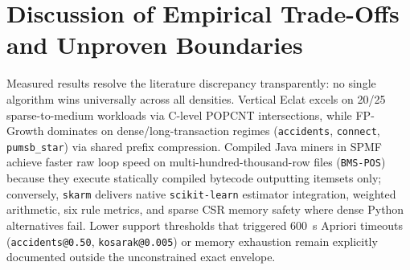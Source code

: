 \section{Discussion of Empirical Trade-Offs and Unproven Boundaries}
Measured results resolve the literature discrepancy transparently: no single algorithm wins universally across all densities. Vertical Eclat excels on 20/25 sparse-to-medium workloads via C-level POPCNT intersections, while FP-Growth dominates on dense/long-transaction regimes (\texttt{accidents}, \texttt{connect}, \texttt{pumsb\_\protect\allowbreak{}star}) via shared prefix compression. Compiled Java miners in SPMF achieve faster raw loop speed on multi-hundred-thousand-row files (\texttt{BMS-POS}) because they execute statically compiled bytecode outputting itemsets only; conversely, \texttt{skarm} delivers native \texttt{scikit-learn} estimator integration, weighted arithmetic, six rule metrics, and sparse CSR memory safety where dense Python alternatives fail. Lower support thresholds that triggered 600~s Apriori timeouts (\texttt{accidents@0.50}, \texttt{kosarak@0.005}) or memory exhaustion remain explicitly documented outside the unconstrained exact envelope.\par
\endgroup
